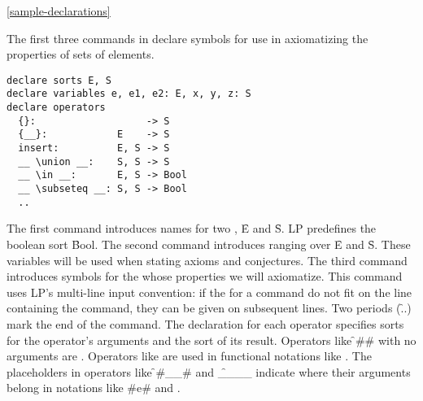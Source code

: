 \ref{sample-declarations}

The first three commands in  declare symbols for use
in axiomatizing the properties of sets of elements.

\begin{verbatim}
declare sorts E, S
declare variables e, e1, e2: E, x, y, z: S
declare operators
  {}:                   -> S
  {__}:            E    -> S
  insert:          E, S -> S
  __ \union __:    S, S -> S
  __ \in __:       E, S -> Bool
  __ \subseteq __: S, S -> Bool
  ..

\end{verbatim}

The first  command introduces names for two ,
\f{E} and \f{S}.  LP predefines the boolean sort \f{Bool}.
\p
The second command introduces  ranging over \f{E}
and \f{S}.  These variables will be used when stating axioms and conjectures.
\p
The third command introduces symbols for the  whose
properties we will axiomatize.  This command uses LP's multi-line input
convention: if the  for a command do not
fit on the line containing the command, they can be given on subsequent lines.
Two periods (\f{..}) mark the end of the command.
\p
The declaration for each operator specifies sorts for the operator's arguments
and the sort of its result.  Operators like \f#{}# with no arguments are
.  Operators like  are used in functional
notations like .  The placeholders in operators like \f#{__}#
and \f{__\in__} indicate where their arguments belong in notations like
\fq#{e}# and .
